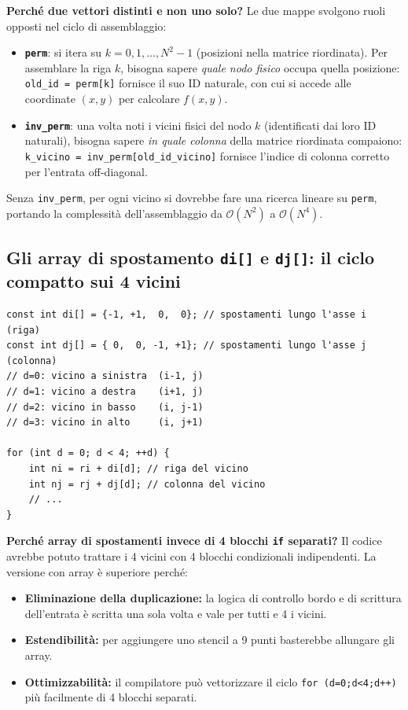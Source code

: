 \documentclass[a4paper,11pt]{article}
\theoremstyle{definition}
\begin{document}
\textbf{Perché due vettori distinti e non uno solo?} Le due mappe svolgono ruoli opposti nel ciclo di assemblaggio:

\begin{itemize}
  \item \textbf{\texttt{perm}}: si itera su $k = 0, 1, \ldots, N^2-1$ (posizioni nella matrice riordinata). Per assemblare la riga $k$, bisogna sapere \emph{quale nodo fisico} occupa quella posizione: \texttt{old\_id = perm[k]} fornisce il suo ID naturale, con cui si accede alle coordinate $(x,y)$ per calcolare $f(x,y)$.
  \item \textbf{\texttt{inv\_perm}}: una volta noti i vicini fisici del nodo $k$ (identificati dai loro ID naturali), bisogna sapere \emph{in quale colonna} della matrice riordinata compaiono: \texttt{k\_vicino = inv\_perm[old\_id\_vicino]} fornisce l'indice di colonna corretto per l'entrata off-diagonal.
\end{itemize}

Senza \texttt{inv\_perm}, per ogni vicino si dovrebbe fare una ricerca lineare su \texttt{perm}, portando la complessità dell'assemblaggio da $\mathcal{O}(N^2)$ a $\mathcal{O}(N^4)$.

\subsection{Gli array di spostamento \texttt{di[]} e \texttt{dj[]}: il ciclo compatto sui 4 vicini}

\begin{lstlisting}[style=cpp, caption={Spostamenti dello stencil codificati in array}]
const int di[] = {-1, +1,  0,  0}; // spostamenti lungo l'asse i (riga)
const int dj[] = { 0,  0, -1, +1}; // spostamenti lungo l'asse j (colonna)
// d=0: vicino a sinistra  (i-1, j)
// d=1: vicino a destra    (i+1, j)
// d=2: vicino in basso    (i, j-1)
// d=3: vicino in alto     (i, j+1)

for (int d = 0; d < 4; ++d) {
    int ni = ri + di[d]; // riga del vicino
    int nj = rj + dj[d]; // colonna del vicino
    // ...
}
\end{lstlisting}

\textbf{Perché array di spostamenti invece di 4 blocchi \texttt{if} separati?} Il codice avrebbe potuto trattare i 4 vicini con 4 blocchi condizionali indipendenti. La versione con array è superiore perché:
\begin{itemize}
  \item \textbf{Eliminazione della duplicazione:} la logica di controllo bordo e di scrittura dell'entrata è scritta una sola volta e vale per tutti e 4 i vicini.
  \item \textbf{Estendibilità:} per aggiungere uno stencil a 9 punti basterebbe allungare gli array.
  \item \textbf{Ottimizzabilità:} il compilatore può vettorizzare il ciclo \texttt{for (d=0;d<4;d++)} più facilmente di 4 blocchi separati.
\end{itemize}
\end{document}
